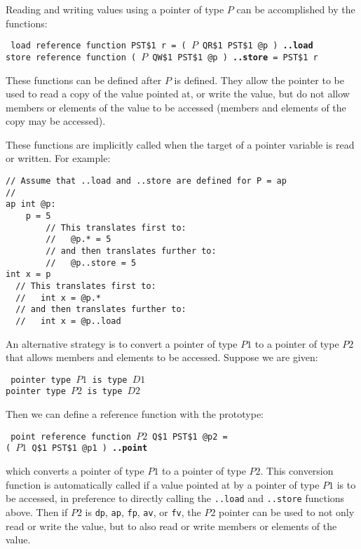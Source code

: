 \documentclass[12pt]{article}
\newcommand{\ttkey}[1]{{\tt \bfseries #1}}
\newenvironment{indpar}[1][0.3in]%
	{\begin{list}{}%
		     {\setlength{\itemsep}{0in}%
		      \setlength{\topsep}{0in}%
		      \setlength{\parsep}{1ex}%
		      \setlength{\labelwidth}{#1}%
		      \setlength{\leftmargin}{#1}%
		      \addtolength{\leftmargin}{\labelsep}}%
	 \item}%
	{\end{list}}
\begin{document}
Reading and writing values using a pointer of type $P$
can be accomplished by the functions:

\begin{indpar}[1ex] \tt
load reference function PST\$1 r =
    ( $P$ QR\$1 PST\$1 @p ) \ttkey{..load} \\
store reference function ( $P$ QW\$1 PST\$1 @p ) \ttkey{..store} =
    PST\$1 r
\end{indpar}

These functions can be defined after $P$ is defined.
They allow the pointer to be used to read a copy of the
value pointed at, or write the value, but do not allow
members or elements of the value to be accessed
(members and elements of the copy may be accessed).

These functions are implicitly called when the target
of a pointer variable is read or written.  For example:
\begin{indpar}\begin{verbatim}
// Assume that ..load and ..store are defined for P = ap
//
ap int @p:
    p = 5
        // This translates first to:
        //   @p.* = 5
        // and then translates further to:
        //   @p..store = 5
int x = p
  // This translates first to:
  //   int x = @p.*
  // and then translates further to:
  //   int x = @p..load
\end{verbatim}\end{indpar}


An alternative strategy is to convert a pointer of type $P1$
to a pointer of type $P2$ that allows members and elements
to be accessed.  Suppose we are given:
\begin{indpar} \tt
pointer type $P1$ is type $D1$ \\
pointer type $P2$ is type $D2$
\end{indpar}

Then we can define a reference function with the prototype:
\begin{indpar}\label{..POINT} \tt
point reference function $P2$ Q\$1 PST\$1 @p2 = \\
\hspace*{1in}( $P1$ Q\$1 PST\$1 @p1 ) \ttkey{..point}
\end{indpar}
which converts a pointer of type $P1$ to a pointer of type $P2$.
This conversion function is automatically called
if a value pointed at by a pointer of type $P1$ is to
be accessed, in preference to directly calling
the {\tt ..load} and {\tt ..store} functions above.
Then if $P2$ is {\tt dp}, {\tt ap}, {\tt fp}, {\tt av},
or {\tt fv}, the $P2$ pointer can be used to not only read or write
the value, but to also read or write members or elements of the
value.
\end{document}
